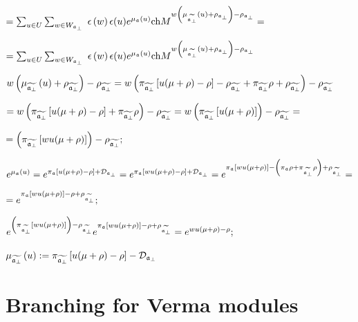\documentclass[12pt]{article}
\theoremstyle{definition}
\begin{document}
$=\sum_{u\in U}\sum_{w\in W_{\frak{a}_{\perp }}}\;\epsilon \left( w\right)
\epsilon (u)e^{\mu _{\frak{a}}\left( u\right) }\mathrm{ch}M^{w\left( \mu _{%
\widetilde{\frak{a}_{\perp }}}\left( u\right) +\rho _{\frak{a}_{\perp
}}\right) -\rho _{\frak{a}_{\perp }}}=$

$=\sum_{u\in U}\sum_{w\in W_{\frak{a}_{\perp }}}\;\epsilon \left( w\right)
\epsilon (u)e^{\mu _{\frak{a}}\left( u\right) }\mathrm{ch}M^{w\left( \mu _{%
\widetilde{\frak{a}_{\perp }}}\left( u\right) +\rho _{\frak{a}_{\perp
}}\right) -\rho _{\frak{a}_{\perp }}}$

$w\left( \mu _{\widetilde{\frak{a}_{\perp }}}\left( u\right) +\rho _{%
\widetilde{\frak{a}_{\perp }}}\right) -\rho _{\widetilde{\frak{a}_{\perp }}%
}=w\left( \pi _{\widetilde{\frak{a}_{\perp }}}\left[ u(\mu +\rho )-\rho %
\right] -\rho _{\widetilde{\frak{a}_{\perp }}}+\pi _{\widetilde{\frak{a}%
_{\perp }}}\rho +\rho _{\widetilde{\frak{a}_{\perp }}}\right) -\rho _{%
\widetilde{\frak{a}_{\perp }}}$

$=w\left( \pi _{\widetilde{\frak{a}_{\perp }}}\left[ u(\mu +\rho )-\rho %
\right] +\pi _{\widetilde{\frak{a}_{\perp }}}\rho \right) -\rho _{\widetilde{%
\frak{a}_{\perp }}}=w\left( \pi _{\widetilde{\frak{a}_{\perp }}}\left[ u(\mu
+\rho )\right] \right) -\rho _{\widetilde{\frak{a}_{\perp }}}=$

$=\left( \pi _{\widetilde{\frak{a}_{\perp }}}\left[ wu(\mu +\rho )\right]
\right) -\rho _{\widetilde{\frak{a}_{\perp }}};$

$e^{\mu _{\frak{a}}\left( u\right) }=e^{\pi _{\frak{a}}\left[ u(\mu +\rho
)-\rho \right] +\mathcal{D}_{\frak{a}_{\perp }}}=e^{\pi _{\frak{a}}\left[
wu(\mu +\rho )-\rho \right] +\mathcal{D}_{\frak{a}_{\perp }}}=e^{\pi _{\frak{%
a}}\left[ wu(\mu +\rho )\right] -\left( \pi _{\frak{a}}\rho +\pi _{%
\widetilde{\frak{a}_{\perp }}}\rho \right) +\rho _{\widetilde{\frak{a}%
_{\perp }}}}=$

$=e^{\pi _{\frak{a}}\left[ wu(\mu +\rho )\right] -\rho +\rho _{\widetilde{%
\frak{a}_{\perp }}}};$

$e^{\left( \pi _{\widetilde{\frak{a}_{\perp }}}\left[ wu(\mu +\rho )\right]
\right) -\rho _{\widetilde{\frak{a}_{\perp }}}}e^{\pi _{\frak{a}}\left[
wu(\mu +\rho )\right] -\rho +\rho _{\widetilde{\frak{a}_{\perp }}%
}}=e^{wu(\mu +\rho )-\rho };$

$\mu _{\widetilde{\frak{a}_{\perp }}}\left( u\right) :=\pi _{\widetilde{%
\frak{a}_{\perp }}}\left[ u(\mu +\rho )-\rho \right] -\mathcal{D}_{\frak{a}%
_{\perp }}$

\section{Branching for Verma modules}
\label{sec:branching-verma}
\end{document}
